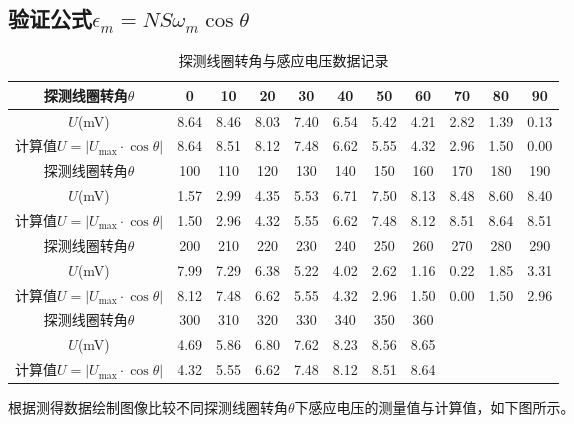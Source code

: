 \documentclass[12pt]{article}
\begin{document}
\subsection{验证公式$\epsilon_m=NS\omega_m\cos\theta$}
\begin{table}[h!]
    \centering
    \begin{tabular}{|c|c|c|c|c|c|c|c|c|c|c|}
        \hline
        探测线圈转角$\theta$ & 0    & 10   & 20   & 30   & 40   & 50   & 60   & 70   & 80   & 90 \\
        \hline
        $U$(mV) & 8.64  & 8.46  & 8.03  & 7.40  & 6.54  & 5.42  & 4.21  & 2.82  & 1.39  & 0.13  \\
        \hline
        计算值$U=|U_{\max}\cdot\cos\theta|$ & 8.64  & 8.51  & 8.12  & 7.48  & 6.62  & 5.55  & 4.32  & 2.96  & 1.50  & 0.00  \\
        \hline
        探测线圈转角$\theta$ & 100  & 110  & 120  & 130  & 140  & 150  & 160  & 170  & 180  & 190 \\
        \hline
        $U$(mV) & 1.57  & 2.99  & 4.35  & 5.53  & 6.71  & 7.50  & 8.13  & 8.48  & 8.60  & 8.40  \\
        \hline
        计算值$U=|U_{\max}\cdot\cos\theta|$ & 1.50  & 2.96  & 4.32  & 5.55  & 6.62  & 7.48  & 8.12  & 8.51  & 8.64  & 8.51  \\
        \hline
        探测线圈转角$\theta$ & 200  & 210  & 220  & 230  & 240  & 250  & 260  & 270  & 280  & 290 \\
        \hline
        $U$(mV) & 7.99  & 7.29  & 6.38  & 5.22  & 4.02  & 2.62  & 1.16  & 0.22  & 1.85  & 3.31  \\
        \hline
        计算值$U=|U_{\max}\cdot\cos\theta|$ & 8.12  & 7.48  & 6.62  & 5.55  & 4.32  & 2.96  & 1.50  & 0.00  & 1.50  & 2.96  \\
        \hline
        探测线圈转角$\theta$ & 300  & 310  & 320  & 330  & 340  & 350  & 360  &      &      &  \\
        \hline
        $U$(mV) & 4.69  & 5.86  & 6.80  & 7.62  & 8.23  & 8.56  & 8.65  &      &      &  \\
        \hline
        计算值$U=|U_{\max}\cdot\cos\theta|$ & 4.32  & 5.55  & 6.62  & 7.48  & 8.12  & 8.51  & 8.64  &      &      &  \\
        \hline
    \end{tabular}%
    \caption{探测线圈转角与感应电压数据记录}
\end{table}%

根据测得数据绘制图像比较不同探测线圈转角$\theta$下感应电压的测量值与计算值，如下图所示。
\end{document}
